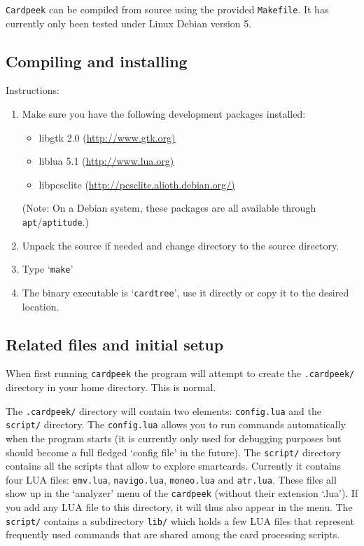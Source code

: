 \documentclass[11pt]{article}
\begin{document}
\texttt{Cardpeek} can be compiled from source using the provided \texttt{Makefile}.
It has currently only been tested under Linux Debian version 5.

\subsection{Compiling and installing}
Instructions:
\begin{enumerate}

\item{Make sure you have the following development packages installed:
  \begin{itemize}
  \item{libgtk 2.0 (\url{http://www.gtk.org)}}
  \item{liblua 5.1 (\url{http://www.lua.org)}}
  \item{libpcsclite (\url{http://pcsclite.alioth.debian.org/)}}
  \end{itemize}
(Note: On a Debian system, these packages are all available through \texttt{apt}/\texttt{aptitude}.)
}

\item{Unpack the source if needed and change directory to the source directory.}

\item{Type `\texttt{make}'}

\item{The binary executable is `\texttt{cardtree}', use it directly or copy it to the desired location.}

\end{enumerate}

\subsection{Related files and initial setup}
When first running \texttt{cardpeek} the program will attempt to create the
\texttt{.cardpeek/} directory in your home directory. This is normal.

The \texttt{.cardpeek/} directory will contain two elements: \texttt{config.lua} and the \texttt{script/} directory.
The \texttt{config.lua} allows you to run commands automatically when the program starts 
(it is currently only used for debugging purposes but should become a full fledged `config file' in the future).
The \texttt{script/} directory contains all the scripts that allow to explore smartcards. 
Currently it contains four LUA files: \texttt{emv.lua}, \texttt{navigo.lua}, \texttt{moneo.lua} and \texttt{atr.lua}.
These files all show up in the `analyzer' menu of the \texttt{cardpeek} (without their extension `.lua').
If you add any LUA file to this directory, it will thus also appear in the menu.
The \texttt{script/} contains a subdirectory \texttt{lib/} which holds a few LUA files that represent frequently used commands that are shared among the card processing scripts.
\end{document}
